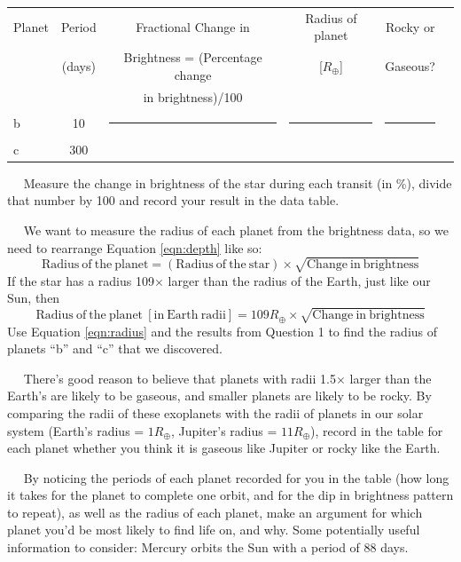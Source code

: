 \documentclass[12pt]{article}
\newcommand{\question}[1]{\vspace{10mm} \noindent {\bf #1)}~~}
\begin{document}
\begin{table}[h!]
\centering
\begin{tabular}{|l |c |c| c| c| c|}
\hline
Planet & Period & Fractional Change in  & Radius of planet & Rocky or  \\
 & (days) & Brightness = (Percentage change   &  [$R_\oplus$] &  Gaseous?  \\
 &     & in brightness)/100 & & \\ \hline
b & 10 & \rule{0pt}{1.5cm} \rule{4cm}{0pt} & \rule{3cm}{0pt} & \rule{3cm}{0pt}\\ \hline
c & 300 & \rule{0pt}{1.5cm} & &\\ \hline
\end{tabular}
\end{table}

\pagebreak

\question{1} Measure the change in brightness of the star during each transit (in \%), divide that  number by 100 and record your result in the data table. 

\question{2} We want to measure the radius of each planet from the brightness data, so we need to rearrange Equation \ref{eqn:depth} like so:
\begin{equation}
\mathrm{Radius~of~the~planet} = \left( \mathrm{Radius~of~the~star} \right) \times \sqrt{\mathrm{Change~in~brightness}}
\end{equation}
If the star has a radius 109$\times$ larger than the radius of the Earth, just like our Sun, then 
\begin{equation}
\mathrm{Radius~of~the~planet~[in~Earth~radii]} = 109R_\oplus  \times \sqrt{\mathrm{Change~in~brightness}} \label{eqn:radius}
\end{equation}
Use Equation \ref{eqn:radius} and the results from Question 1 to find the radius of planets ``b'' and ``c'' that we discovered. 

\question{3} There's good reason to believe that planets with radii 1.5$\times$ larger than the Earth's are likely to be gaseous, and smaller planets are likely to be rocky. By comparing the radii of these exoplanets with the radii of planets in our solar system (Earth's radius = $1 R_\oplus$, Jupiter's radius = $11 R_\oplus$), record in the table for each planet whether you think it is gaseous like Jupiter or rocky like the Earth.


\question{4} By noticing the periods of each planet recorded for you in the table (how long it takes for the planet to complete one orbit, and for the dip in brightness pattern to repeat), as well as the radius of each planet, make an argument for which planet you'd be most likely to find life on, and why. Some potentially useful information to consider: Mercury orbits the Sun with a period of 88 days.
\vspace{4 cm}
\end{document}
